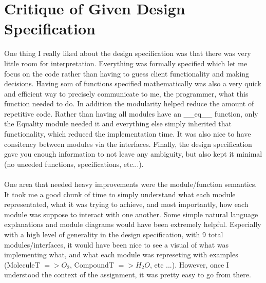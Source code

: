 \documentclass[12pt]{article}
\begin{document}
\section{Critique of Given Design Specification}
One thing I really liked about the design specification was that there was very little room for interpretation. Everything was formally specified which let me focus on the code rather than having to guess client functionality and making decisions. Having som of functions specified mathematically was also a very quick and efficient way to  precisely communicate to me, the programmer, what this function needed to do. In addition the modularity helped reduce the amount of repetitive code. Rather than having all modules have an \_\_eq\_\_ function, only the Equality module needed it and everything else simply inherited that functionality, which reduced the implementation time. It was also nice to have consitency between modules via the interfaces. Finally, the design specification gave you enough information to not leave any ambiguity, but also kept it minimal (no uneeded functions, specifications, etc...).
\\\\
One area that needed heavy improvements were the module/function semantics. It took me a good chunk of time to simply understand what each module representated, what it was trying to achieve, and most importantly, how each module was suppose to interact with one another. Some simple natural language explanations and module diagrams would have been extremely helpful. Especially with a high level of generality in the design specification, with 9 total modules/interfaces, it would have been nice to see a visual of what was implementing what, and what each module was represeting with examples (MoleculeT $=> O_2$, CompoundT $=> H_2O$, etc ...). However, once I understood the context of the assignment, it was pretty easy to go from there.

\clearpage
\end{document}
